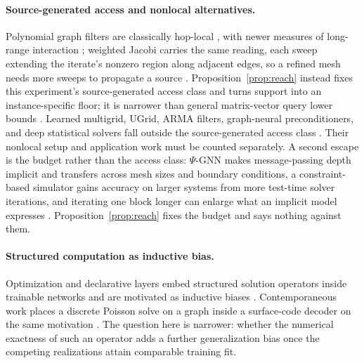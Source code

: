 \paragraph{Source-generated access and nonlocal alternatives.}
Polynomial graph filters are classically hop-local
\citep{defferrard2016convolutional}, with newer measures of long-range
interaction \citep{bamberger2025measuring,kemper2025message}; weighted Jacobi
carries the same reading, each sweep extending the iterate's nonzero region
along adjacent edges, so a refined mesh needs more sweeps to propagate a source
\citep{moore2025gnnla}.
Proposition~\ref{prop:reach} instead fixes this experiment's source-generated
access class and turns support into an instance-specific floor; it is narrower
than general matrix-vector query lower bounds
\citep{derezinski2026matrixvector}. Learned multigrid, UGrid, ARMA filters,
graph-neural preconditioners, and deep statistical solvers fall outside the
source-generated access class
\citep{greenfeld2019multigrid,luz2020amg,han2024ugrid,bianchi2022arma,
chen2025gnp,donon2020deep}.
Their nonlocal setup and application work must be counted separately. A second
escape is the budget rather than the access class: $\Psi$-GNN makes
message-passing depth implicit and transfers across mesh sizes and boundary
conditions, a constraint-based simulator gains accuracy on larger systems from
more test-time solver iterations, and iterating one block longer can enlarge what
an implicit model expresses
\citep{nastorg2024psignn,rubanova2022constraint,liu2026expressive}.
Proposition~\ref{prop:reach} fixes the budget and says nothing against them.

\paragraph{Structured computation as inductive bias.}
Optimization and declarative layers embed structured solution operators inside
trainable networks and are motivated as inductive biases
\citep{amos2017optnet,agrawal2019differentiable,gould2022deep,paulus2024lpgd,
rubanova2022constraint}. Contemporaneous work places a discrete Poisson solve on
a graph inside a surface-code decoder on the same motivation
\citep{trevisanutto2026decoding}.
The question here is narrower: whether the numerical exactness of such an
operator adds a further generalization bias once the competing realizations
attain comparable training fit.

